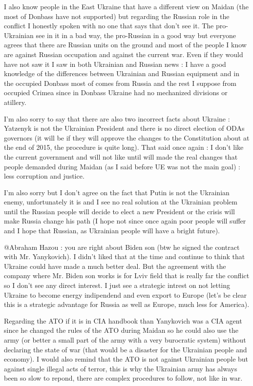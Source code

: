\begin{itemize}
\begin{itemize}
I also know people in the East Ukraine that have a different view on Maidan
(the most of Donbass have not supported) but regarding the Russian role in the
conflict I honestly spoken with no one that says that don't see it. The
pro-Ukrainian see in it in a bad way, the pro-Russian in a good way but
everyone agrees that there are Russian units on the ground and most of the
people I know are against Russian occupation and against the current war. Even
if they would have not saw it I saw in both Ukrainian and Russian news : I have
a good knowledge of the differences between Ukrainian and Russian equipment and
in the occupied Donbass most of comes from Russia and the rest I suppose from
occupied Crimea since in Donbass Ukraine had no mechanized divisions or
atillery. 

I'm also sorry to say that there are also two incorrect facts about Ukraine :
Yatzenyk is not the Ukrainian President and there is no direct election of ODAs
governors (it will be if they will approve the changes to the Constitution
about at the end of 2015, the procedure is quite long). That said once again :
I don't like the current government and will not like until will made the real
changes that people demanded during Maidan (as I said before UE was not the
main goal) : less corruption and justice. 

I'm also sorry but I don't agree on the fact that Putin is not the Ukrainian
enemy, unfortunately it is and I see no real solution at the Ukrainian problem
until the Russian people will decide to elect a new President or the crisis
will make Russia change his path (I hope not since once again poor people will
suffer and I hope that Russian, as Ukrainian people will have a bright future).


@Abraham Hazou : you are right about Biden son (btw he signed the contract with
Mr. Yanykovich). I didn't liked that at the time and continue to think that
Ukraine could have made a much better deal. But the agreement with the company
where Mr. Biden son works is for Lviv field that is really far the conflict so
I don't see any direct interest. I just see a strategic intrest on not letting
Ukraine to become energy indipendend and even export to Europe (let's be clear
this is a strategic advantage for Russia as well as Europe, much less for
America). 

Regarding the ATO if it is in CIA handbook than Yanykovich was a CIA agent
since he changed the rules of the ATO during Maidan so he could also use the
army (or better a small part of the army with a very burocratic system) without
declaring the state of war (that would be a disaster for the Ukrainian people
and economy). I would also remind that the ATO is not against Ukrainian people
but against single illegal acts of terror, this is why the Ukrainian army has
always been so slow to repond, there are complex procedures to follow, not like
in war.


\end{itemize}
\end{itemize}

